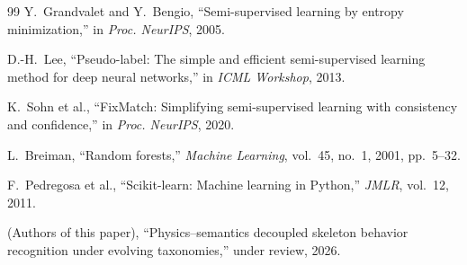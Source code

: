 \documentclass[preprint,12pt,number]{elsarticle}
\begin{document}
\begin{thebibliography}{99}
Y.~Grandvalet and Y.~Bengio, ``Semi-supervised learning by entropy
minimization,'' in \emph{Proc. NeurIPS}, 2005.

D.-H.~Lee, ``Pseudo-label: The simple and efficient semi-supervised
learning method for deep neural networks,'' in \emph{ICML Workshop}, 2013.

K.~Sohn et al., ``FixMatch: Simplifying semi-supervised learning with
consistency and confidence,'' in \emph{Proc. NeurIPS}, 2020.

L.~Breiman, ``Random forests,'' \emph{Machine Learning}, vol.~45, no.~1,
2001, pp.~5--32.

F.~Pedregosa et al., ``Scikit-learn: Machine learning in Python,'' \emph{JMLR},
vol.~12, 2011.

(Authors of this paper), ``Physics--semantics decoupled skeleton behavior
recognition under evolving taxonomies,'' under review, 2026.

\end{thebibliography}

\clearpage

\end{document}
